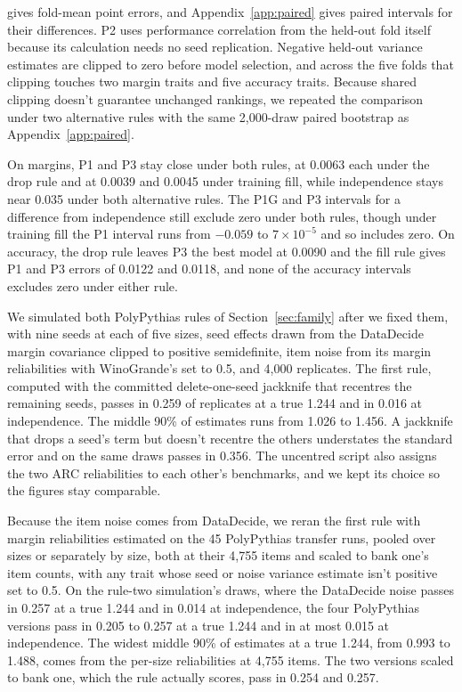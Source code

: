  gives fold-mean point errors, and Appendix~\ref{app:paired} gives paired intervals for their differences. P2 uses performance correlation from the held-out fold itself because its calculation needs no seed replication. Negative held-out variance estimates are clipped to zero before model selection, and across the five folds that clipping touches two margin traits and five accuracy traits. Because shared clipping doesn't guarantee unchanged rankings, we repeated the comparison under two alternative rules with the same 2,000-draw paired bootstrap as Appendix~\ref{app:paired}.

On margins, P1 and P3 stay close under both rules, at 0.0063 each under the drop rule and at 0.0039 and 0.0045 under training fill, while independence stays near 0.035 under both alternative rules. The P1G and P3 intervals for a difference from independence still exclude zero under both rules, though under training fill the P1 interval runs from $-0.059$ to $7\times10^{-5}$ and so includes zero. On accuracy, the drop rule leaves P3 the best model at 0.0090 and the fill rule gives P1 and P3 errors of 0.0122 and 0.0118, and none of the accuracy intervals excludes zero under either rule.

We simulated both PolyPythias rules of Section~\ref{sec:family} after we fixed them, with nine seeds at each of five sizes, seed effects drawn from the DataDecide margin covariance clipped to positive semidefinite, item noise from its margin reliabilities with WinoGrande's set to 0.5, and 4,000 replicates. The first rule, computed with the committed delete-one-seed jackknife that recentres the remaining seeds, passes in 0.259 of replicates at a true 1.244 and in 0.016 at independence. The middle 90\% of estimates runs from 1.026 to 1.456. A jackknife that drops a seed's term but doesn't recentre the others understates the standard error and on the same draws passes in 0.356. The uncentred script also assigns the two ARC reliabilities to each other's benchmarks, and we kept its choice so the figures stay comparable.

Because the item noise comes from DataDecide, we reran the first rule with margin reliabilities estimated on the 45 PolyPythias transfer runs, pooled over sizes or separately by size, both at their 4,755 items and scaled to bank one's item counts, with any trait whose seed or noise variance estimate isn't positive set to 0.5. On the rule-two simulation's draws, where the DataDecide noise passes in 0.257 at a true 1.244 and in 0.014 at independence, the four PolyPythias versions pass in 0.205 to 0.257 at a true 1.244 and in at most 0.015 at independence. The widest middle 90\% of estimates at a true 1.244, from 0.993 to 1.488, comes from the per-size reliabilities at 4,755 items. The two versions scaled to bank one, which the rule actually scores, pass in 0.254 and 0.257.

